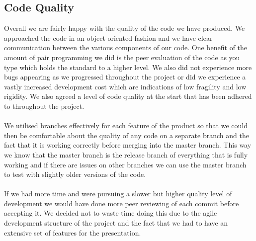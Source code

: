 \documentclass{article}
\begin{document}
\subsection{Code Quality}
Overall we are fairly happy with the quality of the code we have produced. We approached the code in an object oriented fashion and we have clear communication between the various components of our code. One benefit of the amount of pair programming we did is the peer evaluation of the code as you type which holds the standard to a higher level. We also did not experience more bugs appearing as we progressed throughout the project or did we experience a vastly increased development cost which are indications of low fragility and low rigidity. We also agreed a level of code quality at the start that has been adhered to throughout the project.
\\\\
We utilised branches effectively for each feature of the product so that we could then be comfortable about the quality of any code on a separate branch and the fact that it is working correctly before merging into the master branch. This way we know that the master branch is the release branch of everything that is fully working and if there are issues on other branches we can use the master branch to test with slightly older versions of the code.
\\\\
If we had more time and were pursuing a slower but higher quality level of development we would have done more peer reviewing of each commit before accepting it. We decided not to waste time doing this due to the agile development structure of the project and the fact that we had to have an extensive set of features for the presentation.
\end{document}
